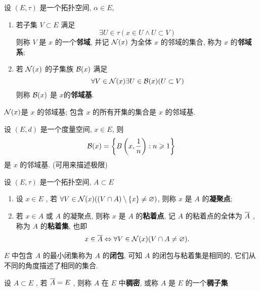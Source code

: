 \begin{Definition}[邻域基]\label{def:邻域基}
	设 $ (E, \tau) $ 是一个拓扑空间, $ \alpha\in E $,
	\begin{enumerate}[(1)]
		\item 若子集 $ V\subset E $ 满足
		      \[
			      \exists U\in \tau(x\in U\land U\subset V)
		      \]
		      则称 $ V $ 是 $ x $ 的一个\textbf{邻域}, 并记 $ \CN(x) $ 为全体 $ x $ 的邻域的集合, 称为 $ x $ 的\textbf{邻域系};
		\item 若 $ \CN(x) $ 的子集族 $ \CB(x) $ 满足
		      \[
			      \forall V\in \CN(x)\exists U\in \CB(x)(U\subset V)
		      \]
		      则称 $ \CB(x) $ 是 $ x $的\textbf{邻域基}.
	\end{enumerate}
\end{Definition}
\begin{Remark}
	$ \CN(x) $是 $ x $  的邻域基; 包含 $ x $ 的所有开集的集合是 $ x $ 的邻域基.
\end{Remark}
\begin{Example}
	设 $ (E, d) $ 是一个度量空间, $ x\in E $, 则
	\[
		\CB(x)=\left\{ B\left(x,\frac{1}{n}\right): n\geqslant 1 \right\}
	\]
	是 $ x $ 的邻域基. (可用来描述极限)
\end{Example}
\begin{Definition}[粘着集]
	设 $ (E, \tau) $ 是一个拓扑空间, $ A\subset E $
	\begin{enumerate}[(1)]
		\item 设 $ x\in E $ , 若 $ \forall V\in \CN(x)((V\cap A)\sm \{ x \}\neq\varnothing) $, 则称 $ x $ 是 $ A $ 的\textbf{凝聚点};
		\item 若 $ x\in A $ 或 $ A $  的凝聚点, 则称 $ x $ 是 $ A $ 的\textbf{粘着点}, 记 $ A $ 的粘着点的全体为 $ \baro{A} $ , 称为 $ A $ 的\textbf{粘着集}, 也即
		      \[
			      x\in \baro{A}\Leftrightarrow \forall V\in \CN(x)(V\cap A\neq\varnothing).
		      \]
	\end{enumerate}
\end{Definition}
\begin{Remark}
	$ E $ 中包含 $ A $ 的最小闭集称为 $ A $ 的\textbf{闭包}, 可知 $ A $ 的闭包与粘着集是相同的, 它们从不同的角度描述了相同的集合.
\end{Remark}
\begin{Definition}[稠密]\label{def:稠密}
	设 $ A\subset E $ , 若 $ \baro{A}=E $ , 则称 $ A $ 在 $ E $ 中\textbf{稠密}, 或称 $ A $ 是 $ E $ 的一个\textbf{稠子集}
\end{Definition}
